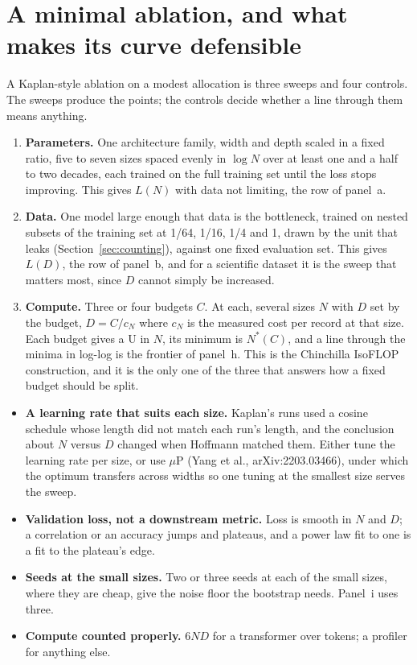 
\section{A minimal ablation, and what makes its curve defensible}
\label{sec:ablation}

A Kaplan-style ablation on a modest allocation is three sweeps and four controls.
The sweeps produce the points; the controls decide whether a line through them
means anything.

\begin{enumerate}
\item \textbf{Parameters.} One architecture family, width and depth scaled in a
fixed ratio, five to seven sizes spaced evenly in $\log N$ over at least one and a
half to two decades, each trained on the full training set until the loss stops
improving. This gives $L(N)$ with data not limiting, the row of panel~a.
\item \textbf{Data.} One model large enough that data is the bottleneck, trained
on nested subsets of the training set at 1/64, 1/16, 1/4 and 1, drawn by the unit
that leaks (Section~\ref{sec:counting}), against one fixed evaluation set. This
gives $L(D)$, the row of panel~b, and for a scientific dataset it is the sweep that
matters most, since $D$ cannot simply be increased.
\item \textbf{Compute.} Three or four budgets $C$. At each, several sizes $N$ with
$D$ set by the budget, $D = C / c_N$ where $c_N$ is the measured cost per record at
that size. Each budget gives a U in $N$, its minimum is $N^*(C)$, and a line
through the minima in log-log is the frontier of panel~h. This is the Chinchilla
IsoFLOP construction, and it is the only one of the three that answers how a fixed
budget should be split.
\end{enumerate}

\begin{itemize}
\item \textbf{A learning rate that suits each size.} Kaplan's runs used a cosine
schedule whose length did not match each run's length, and the conclusion about
$N$ versus $D$ changed when Hoffmann matched them. Either tune the learning rate per
size, or use $\mu$P (Yang et al., arXiv:2203.03466), under which the optimum transfers across widths so one tuning
at the smallest size serves the sweep.
\item \textbf{Validation loss, not a downstream metric.} Loss is smooth in $N$
and $D$; a correlation or an accuracy jumps and plateaus, and a power law fit to
one is a fit to the plateau's edge.
\item \textbf{Seeds at the small sizes.} Two or three seeds at each of the small
sizes, where they are cheap, give the noise floor the bootstrap needs. Panel~i uses
three.
\item \textbf{Compute counted properly.} $6ND$ for a transformer over tokens;
a profiler for anything else.
\end{itemize}

